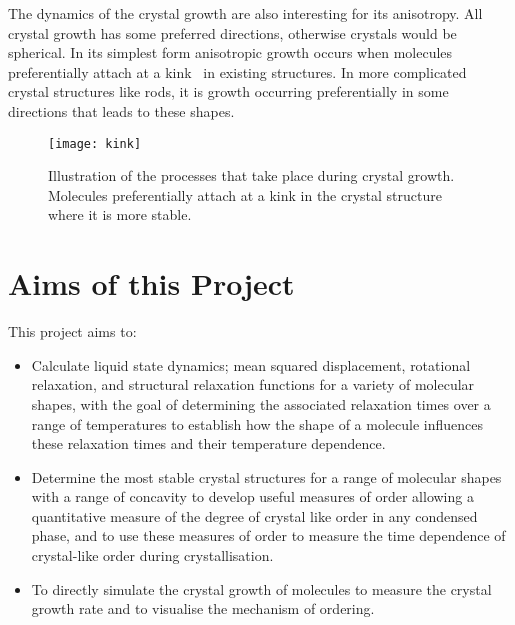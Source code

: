 The dynamics of the crystal growth are also interesting for its anisotropy. All crystal growth has some preferred directions, otherwise crystals would be spherical. In its simplest form anisotropic growth occurs when molecules preferentially attach at a kink~ in existing structures. In more complicated crystal structures like rods, it is growth occurring preferentially in some directions that leads to these shapes.

\begin{figure}
    \centering
    \texttt{[image: kink]}
    \caption{Illustration of the processes that take place during crystal growth. Molecules preferentially attach at a kink in the crystal structure where it is more stable.}
    \label{fig:kink}
\end{figure}

\section{Aims of this Project}

This project aims to:
\begin{itemize}
    \item Calculate liquid state dynamics; mean squared displacement, rotational relaxation, and structural relaxation functions for a variety of molecular shapes, with the goal of determining the associated relaxation times over a range of temperatures to establish how the shape of a molecule influences these relaxation times and their temperature dependence. 
    \item Determine the most stable crystal structures for a range of molecular shapes with a range of concavity to develop useful measures of order allowing a quantitative measure of the degree of crystal like order in any condensed phase, and to use these measures of order to measure the time dependence of crystal-like order during crystallisation.
    \item To directly simulate the crystal growth of molecules to measure the crystal growth rate and to visualise the mechanism of ordering.
\end{itemize}
